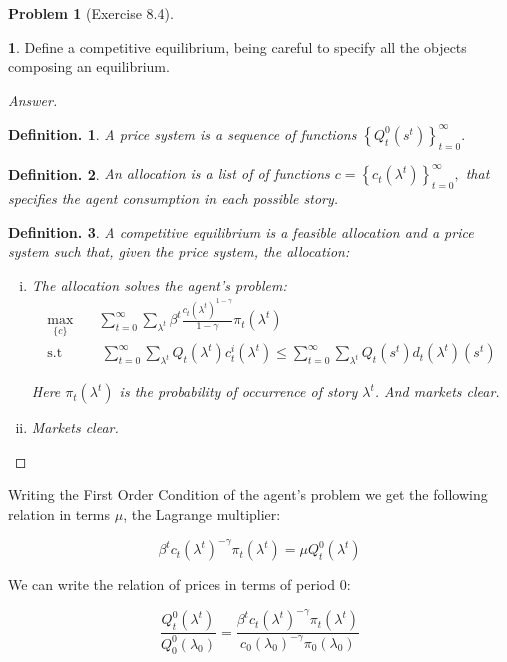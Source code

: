 \documentclass[12pt]{article}
\newtheorem{defin}{Definition.}
\theoremstyle{definition}
\newtheorem{problem}{Problem}
\newtheorem{subproblem}{}[problem]
\begin{document}
\begin{problem}[Exercise 8.4]
\begin{subproblem}
    Define a competitive equilibrium, being careful to specify all the objects composing an equilibrium.
\end{subproblem}
\begin{proof}[Answer]
\begin{defin}
A price system is a sequence of functions $\left\{Q^0_t(s^t)\right\}_{t=0}^{\infty} .$ 
\end{defin}
\begin{defin}
An allocation is a list of of functions $c=\left\{c_{t}\left(\lambda^{t}\right)\right\}_{t=0}^{\infty},$ that specifies the agent consumption in each possible story.
\end{defin}
\begin{defin}
A competitive equilibrium is a feasible allocation and a price system such that, given the price system, the allocation:
\begin{enumerate}[(i)]
    \item The allocation solves the agent's problem:
    \begin{align}
			\max_{\{c\}} &\quad \sum_{t=0}^{\infty} \sum_{\lambda^{t}} \beta^{t} \frac{c_{t}(\lambda^t)^{1-\gamma}}{1-\gamma} \pi_{t}\left(\lambda^{t}\right)\\
			\text{s.t}&\quad \ \sum_{t=0}^{\infty} \sum_{\lambda^t} Q_t(\lambda^t) c_{t}^{i}\left(\lambda^t\right) \leq \sum_{t=0}^{\infty} \sum_{\lambda^t} Q_t(s^t) d_{t}(\lambda^t)\left(s^{t}\right)
\end{align}

Here $\pi_{t}\left(\lambda^{t}\right)$ is the probability of occurrence of story $\lambda^t$. And markets clear.
\item Markets clear.
\end{enumerate}

\end{defin}

\end{proof}
Writing the First Order Condition of the agent's problem we get the following relation in terms $\mu$, the Lagrange multiplier:

 $$\beta^{t} c_{t}\left(\lambda^{t}\right)^{-\gamma} \pi_{t}\left(\lambda^{t}\right)=\mu Q^0_t(\lambda^t)$$

 We can write the relation of prices in terms of period 0:

$$ \frac{Q^0_t(\lambda^t)}{Q^0_0(\lambda_0)} =  \frac{\beta^{t} c_{t}\left(\lambda^{t}\right)^{-\gamma} \pi_{t}\left(\lambda^{t}\right)}{ c_{0}\left(\lambda_0\right)^{-\gamma} \pi_{0}\left(\lambda_0\right)} $$


\end{problem}
\end{document}
